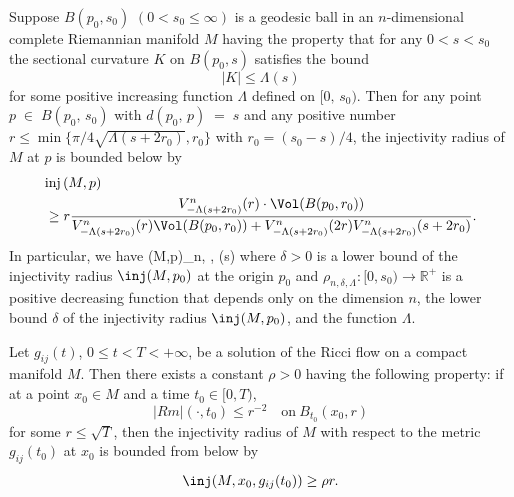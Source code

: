 \begin{corollary}
  \label{cor:cz-injectivity-radius-from-local-curvature-scale}
Suppose $B(p_0, s_0)$ $(0<s_0\le \infty)$ is a geodesic ball in an
$n$-dimensional complete Riemannian manifold $M$ having the
property that for any $0<s<s_0$ the sectional curvature $K$ on
$B(p_0, s)$ satisfies the bound
$$
|K|\le \Lambda(s)
$$
for\; some\; positive\; increasing\; function\; $\Lambda$\;
defined\; on\; $[0,\,s_0)$.\; Then\; for\; any\; point\; $p\;\in\;
B(p_0,\, s_0)$\; with\; $d(p_0,\, p)\;=\;s$\; and\; any\;
positive\; number $r\le \min\{\pi/4\sqrt{\Lambda(s+2r_0)},r_0\}$
with $r_0=(s_0-s)/4$, the injectivity radius of $M$ at $p$ is
bounded below by
\begin{align*}
& {\rm inj}\,(M,p) \\
&\geq r \frac{V^{n}_{-\Lambda(s+2r_0)}(r)\cdot
\Vol(B(p_0,r_0))}{V^{n}_{-\Lambda(s+2r_0)}(r)\Vol(B(p_0,r_0))+
V_{-\Lambda(s+2r_0)}^n(2r)V^{n}_{-\Lambda(s+2r_0)}(s+2r_0)}.
\end{align*}
In particular, we have \be
\inj(M,p)\geq \rho_{n, \delta, \Lambda}(s) %
\ee where $\delta>0$ is a lower bound of the injectivity radius
$\inj(M, p_0)$ at the origin $p_0$ and $\rho_{n,\delta, \Lambda}:
[0, s_0) \to \mathbb{R^+}$ is a positive decreasing function that
depends only on the dimension $n$, the lower bound $\delta$ of the
injectivity radius $\inj(M,p_0)$, and the function $\Lambda$.
\end{corollary}
\begin{theorem}
  \label{thm:cz-little-loop-lemma}
Let $g_{ij}(t)$, $0\le t<T<+\infty$, be a solution of the Ricci
flow on a compact manifold $M$. Then there exists a constant
$\rho>0$ having the following property: if at a point $x_0\in M$
and a time $t_0\in [0,T)$,
$$ |Rm|(\cdot,t_0)\leq r^{-2} \quad
\text{on}\ B_{t_0}(x_0,r)
$$
for some $r\leq \sqrt{T}$, then the injectivity radius of $M$ with
respect to the metric $g_{ij}(t_0)$ at $x_0$ is bounded from below
by
$$
\inj(M,x_0,g_{ij}(t_0))\geq \rho r.
$$
\end{theorem}

